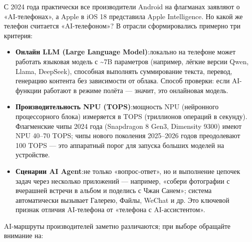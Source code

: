


С 2024 года практически все производители Android на флагманах заявляют о «AI-телефонах», а Apple в iOS 18 представила Apple Intelligence. Но какой же телефон считается «AI-телефоном»? В отрасли сформировались примерно три критерия:

\begin{itemize}
  \item \textbf{Онлайн LLM (Large Language Model)}:локально на телефоне может работать языковая модель с \textasciitilde{}7B параметров (например, лёгкие версии Qwen, Llama, DeepSeek), способная выполнять суммирование текста, перевод, генерацию контента без зависимости от облака. Способ проверки: если AI-функции работают в режиме полёта — значит, это онлайновая модель.
  \item \textbf{Производительность NPU (TOPS)}:мощность NPU (нейронного процессорного блока) измеряется в TOPS (триллионов операций в секунду). Флагменские чипы 2024 года (Snapdragon 8 Gen3, Dimensity 9300) имеют NPU 40–70 TOPS; чипы нового поколения 2025–2026 годов преодолевают 100 TOPS — это аппаратный порог для запуска больших моделей на устройстве.
  \item \textbf{Сценарии AI Agent}:не только «вопрос-ответ», но и выполнение цепочек задач через несколько приложений — например, «собери фотографии с вчерашней встречи в альбом и поделись с Чжан Санем»; система автоматически вызывает Галерею, Файлы, WeChat и др. Это ключевой признак отличия AI-телефона от «телефона с AI-ассистентом».
\end{itemize}


AI-маршруты производителей заметно различаются; при выборе обращайте внимание на:


